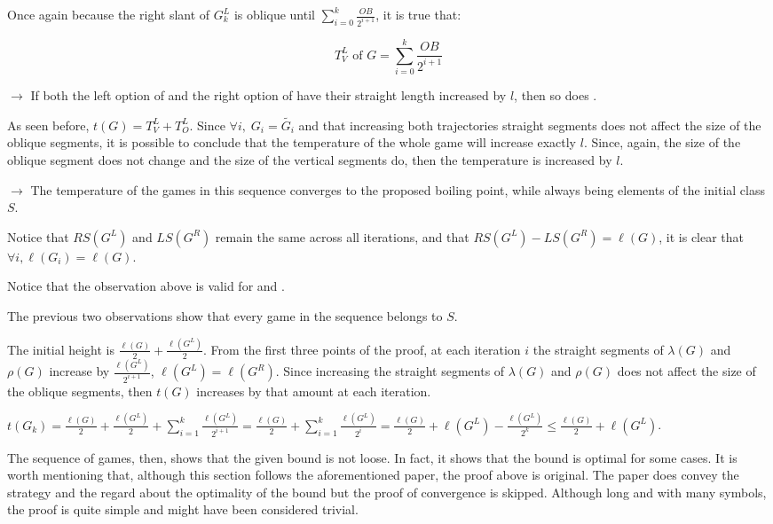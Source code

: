 \begin{list}{}{}
	Once again because the right slant of $G_k^L$ is oblique until $\sum\limits_{i=0}^{k}\frac{OB}{2^{i+1}}$, it is true that:
	
	$$
	T^L_V \text{ of } G = \sum\limits_{i=0}^{k}\frac{OB}{2^{i+1}}
	$$
	
	\item[$\rightarrow$] If both the left option of  and the right option of  have their straight length increased by $l$, then so does \Gm{}.
	\item[ ] As seen before, $t(G) = T^L_V + T^L_O$. Since $\forall i,\; G_i = \tilde{G_i}$ and that increasing both trajectories straight segments does not affect the size of the oblique segments, it is possible to conclude that the temperature of the whole game will increase exactly $l$. Since, again, the size of the oblique segment does not change and the size of the vertical segments do, then the temperature is increased by $l$.
	\item[$\rightarrow$] The temperature of the games in this sequence converges to the proposed boiling point, while always being elements of the initial class $S$.
	\item[ ] Notice that $RS(G^L)$ and $LS(G^R)$ remain the same across all iterations, and that $RS(G^L) - LS(G^R) = \ell(G)$, it is clear that $\forall i, \ell(G_i) = \ell(G)$.
	\item[ ] Notice that the observation above is valid for  and .
	\item[ ] The previous two observations show that every game in the sequence belongs to $S$.
	\item[ ] The initial height is $\frac{\ell(G)}{2} + \frac{\ell(G^L)}{2}$. From the first three points of the proof, at each iteration $i$ the straight segments of $\lambda(G)$ and $\rho(G)$ increase by $\frac{\ell(G^L)}{2^{i+1}}$, $\ell(G^L) = \ell(G^R)$. Since increasing the straight segments of $\lambda(G)$ and $\rho(G)$ does not affect the size of the oblique segments, then $t(G)$ increases by that amount at each iteration.
	\item[] \hspace{-1cm} $t(G_k) = \frac{\ell(G)}{2} + \frac{\ell(G^L)}{2} + \sum\limits_{i=1}^{k} \frac{\ell(G^L)}{2^{i+1}} = \frac{\ell(G)}{2} + \sum\limits_{i=1}^{k} \frac{\ell(G^L)}{2^{i}} = \frac{\ell(G)}{2} + \ell(G^L) - \frac{\ell(G^L)}{2^k} \leq \frac{\ell(G)}{2} + \ell(G^L)$.
\end{list}

The sequence of games, then, shows that the given bound is not loose. In fact, it shows that the bound is optimal for some cases. It is worth mentioning that, although this section follows the aforementioned paper, the proof above is original. The paper does convey the strategy and the regard about the optimality of the bound but the proof of convergence is skipped. Although long and with many symbols, the proof is quite simple and might have been considered trivial.

